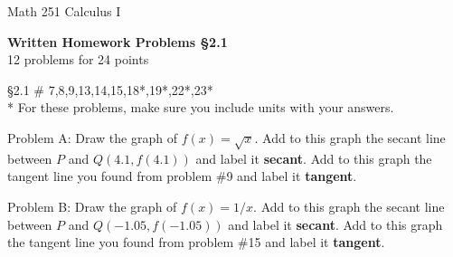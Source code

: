 \documentclass[11pt]{report}
\theoremstyle{plain}
\begin{document}
\hfill Math 251 Calculus I
\begin{center}
\Large{\textbf{Written Homework Problems \S 2.1}} \\
12 problems for 24 points\\
\end{center}
\begin{description}
\item{\S 2.1} \# 7,8,9,13,14,15,18*,19*,22*,23* \\

* For these problems, make sure you include units with your answers.\\

\item Problem A: Draw the graph of $f(x)=\sqrt{x}.$ Add to this graph the secant line between $P$ and $Q(4.1, f(4.1))$ and label it \textbf{secant}. Add to this graph the tangent line you found from problem \#9 and label it \textbf{tangent}.

\item Problem B: Draw the graph of $f(x)=1/x.$ Add to this graph the secant line between $P$ and $Q(-1.05, f(-1.05))$ and label it \textbf{secant}. Add to this graph the tangent line you found from problem \#15 and label it \textbf{tangent}.

\end{description}
\end{document}
